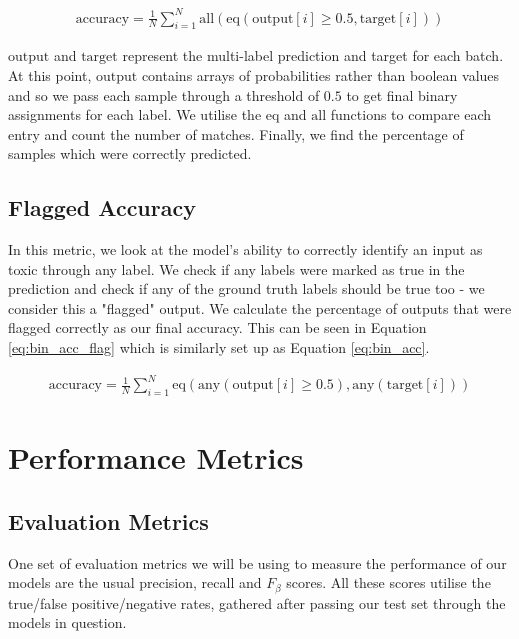 \begin{equation}
    \begin{gathered}
        \text{accuracy} = \frac{1}{N} \sum_{i=1}^{N} \text{all}(\text{eq}(\text{output}[i] \geq 0.5, \text{target}[i]))
    \end{gathered}
    \label{eq:bin_acc}
\end{equation}

$\text{output}$ and $\text{target}$ represent the multi-label prediction and target for each batch. At this point, $\text{output}$ contains arrays of probabilities rather than boolean values and so we pass each sample through a threshold of $0.5$ to get final binary assignments for each label. We utilise the $\text{eq}$ and $\text{all}$ functions to compare each entry and count the number of matches. Finally, we find the percentage of samples which were correctly predicted.

\subsection{Flagged Accuracy}

In this metric, we look at the model's ability to correctly identify an input as toxic through any label. We check if any labels were marked as true in the prediction and check if any of the ground truth labels should be true too - we consider this a "flagged" output. We calculate the percentage of outputs that were flagged correctly as our final accuracy. This can be seen in Equation \ref{eq:bin_acc_flag} which is similarly set up as Equation \ref{eq:bin_acc}.

\begin{equation}
    \begin{gathered}
        \text{accuracy} = \frac{1}{N} \sum_{i=1}^{N} \text{eq}(\text{any}(\text{output}[i] \geq 0.5), \text{any}(\text{target}[i]))
    \end{gathered}
    \label{eq:bin_acc_flag}
\end{equation}

\section{Performance Metrics}

\subsection{Evaluation Metrics}
\label{eval_metrics}

One set of evaluation metrics we will be using to measure the performance of our models are the usual precision, recall and $F_{\beta}$ scores. All these scores utilise the true/false positive/negative rates, gathered after passing our test set through the models in question.

